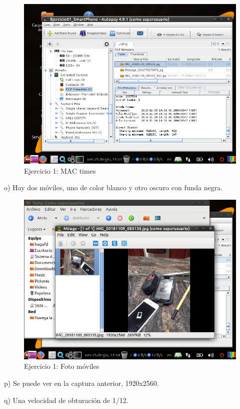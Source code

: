 \documentclass[11pt]{article}
\begin{document}
\begin{figure}[H]
    \caption{Ejercicio 1: MAC times}
    \centering
    \includegraphics[scale=0.7]{e1-15.png}
\end{figure}

o) Hay dos móviles, uno de color blanco y otro oscuro con funda negra.

\begin{figure}[H]
    \caption{Ejercicio 1: Foto móviles}
    \centering
    \includegraphics[scale=0.7]{e1-16.png}
\end{figure}

p) Se puede ver en la captura anterior, 1920x2560.

q) Una velocidad de obturación de 1/12.
\end{document}
